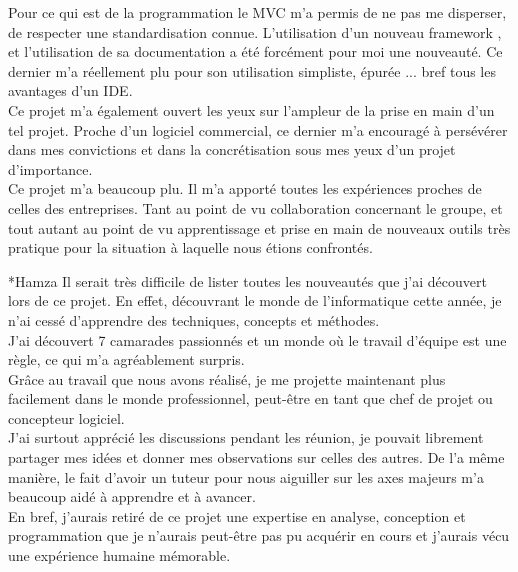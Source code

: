 \documentclass[a4paper, 12pt]{report}
\begin{document}
\begin{chapter}
\begin{section}
		Pour ce qui est de la programmation le MVC m'a permis de ne pas me disperser, de respecter une standardisation connue. L'utilisation d'un 
		nouveau framework , et l'utilisation de sa documentation a été forcément pour moi une nouveauté. Ce dernier m'a réellement plu pour son
		utilisation simpliste, épurée ... bref tous les avantages d'un IDE.\\

		Ce projet m'a également ouvert les yeux sur l'ampleur de la prise en main d'un tel projet. Proche d'un logiciel commercial, ce dernier m'a
		encouragé à persévérer dans mes convictions et dans la concrétisation sous mes yeux d'un projet d'importance.\\ 

		Ce projet m'a beaucoup plu. Il m'a apporté toutes les expériences proches de celles des entreprises. Tant au point de vu collaboration
		concernant le groupe, et tout autant au point de vu apprentissage et prise en main de nouveaux outils très pratique pour la situation à
		laquelle nous étions confrontés.\\
		\end{section}

		\begin{section}*{Hamza}
		Il serait très difficile de lister toutes les nouveautés que j'ai découvert lors de ce projet. En effet, découvrant le monde de l'informatique
		cette année, je n'ai cessé d'apprendre des techniques, concepts et méthodes.\\

		J'ai découvert 7 camarades passionnés et un monde où le travail d'équipe est une règle, ce qui m'a agréablement surpris.\\
		Grâce au travail que nous avons réalisé, je me projette maintenant plus facilement dans le monde professionnel, peut-être en tant
		que chef de projet ou concepteur logiciel.\\

		J'ai surtout apprécié les discussions pendant les réunion, je pouvait librement partager mes idées et donner mes observations sur
		celles des autres. De l'a même manière, le fait d'avoir un tuteur pour nous aiguiller sur les axes majeurs m'a beaucoup aidé à apprendre
		et à avancer.\\

		En bref, j'aurais retiré de ce projet une expertise en analyse, conception et programmation que je n'aurais peut-être pas pu acquérir en
		cours et j'aurais vécu une expérience humaine mémorable.
		\end{section}


\end{chapter}
\end{document}

